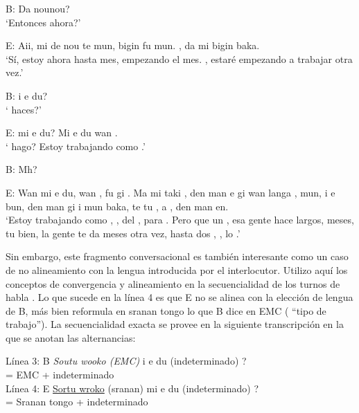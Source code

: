 \documentclass[output=paper]{langscibook}
\begin{document}
B: Da   nounou?\\
‘Entonces   ahora?’
\bigskip

E: Aii, mi de   nou te  mun, bigin fu  mun.  , da mi bigin baka.\\
‘Sí, estoy   ahora hasta  mes, empezando el  mes. , estaré empezando a trabajar otra vez.’
\bigskip

B:  i e du?\\
‘ haces?’
\bigskip

E:  mi e du? Mi e du wan .\\
‘  hago? Estoy trabajando como  .’
\bigskip

B: Mh?
\bigskip

E: Wan  mi e du, wan  , fu  gi . Ma mi  taki  , den man  e gi wan langa ,  mun,  i e  bun, den man gi i  mun baka, te  tu , a , den man  en.\\

‘Estoy trabajando como ,  , del , para .  Pero  que  un , esa gente  hace  largos,  meses,  tu  bien, la gente te da  meses otra vez, hasta  dos , , lo .'
\z

Sin embargo, este fragmento conversacional  es también interesante como un caso de no alineamiento con la lengua introducida por el interlocutor. Utilizo aquí los conceptos de convergencia y alineamiento en la secuencialidad de los turnos de habla \citep{Auer1995}. Lo que sucede en la línea 4 es que E no se alinea con la elección de lengua de B, más bien reformula en sranan tongo  lo que B dice en EMC
( “tipo de trabajo”). La secuencialidad exacta se provee en la siguiente transcripción en la que se anotan las alternancias:

\ea
Línea 3: B \textit{Soutu wooko (EMC)} i e du (indeterminado) ?\\
= EMC + indeterminado\\
Línea 4: E \uline{Sortu wroko}  (sranan) mi e du (indeterminado) ? \\
= Sranan tongo + indeterminado
\z
\end{document}
